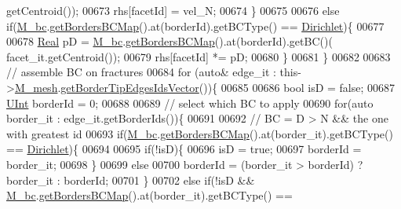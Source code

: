 \begin{DoxyCode}
      getCentroid());
00673             rhs[facetId] = vel\_N;
00674         \}
00675         
00676         \textcolor{keywordflow}{else} \textcolor{keywordflow}{if}(\hyperlink{classFVCode3D_1_1StiffMatrix_a23e3ffc97fcf112958e9966cac41e9d3}{M\_bc}.\hyperlink{classFVCode3D_1_1BoundaryConditions_a5b53a81bdab88709fae14892bfe6a7c9}{getBordersBCMap}().at(borderId).getBCType() == 
      \hyperlink{namespaceFVCode3D_a73660061f11f1671164ce171a053f8c5a192024697bdaa4fbbb39b8961b747bce}{Dirichlet})\{
00677                         
00678                         \hyperlink{namespaceFVCode3D_a40c1f5588a248569d80aa5f867080e83}{Real} pD = \hyperlink{classFVCode3D_1_1StiffMatrix_a23e3ffc97fcf112958e9966cac41e9d3}{M\_bc}.\hyperlink{classFVCode3D_1_1BoundaryConditions_a5b53a81bdab88709fae14892bfe6a7c9}{getBordersBCMap}().at(borderId).getBC()(
      facet\_it.getCentroid());
00679                         rhs[facetId] *= pD;
00680                 \}
00681     \}
00682 
00683     \textcolor{comment}{// assemble BC on fractures}
00684     \textcolor{keywordflow}{for} (\textcolor{keyword}{auto}& edge\_it : this->\hyperlink{classFVCode3D_1_1MatrixHandler_a72f185cb557fc2e8023bd09a074f685c}{M\_mesh}.\hyperlink{classFVCode3D_1_1Rigid__Mesh_a12c92b683cfb3d9ac2645f038a8c6220}{getBorderTipEdgesIdsVector}())\{
00685                 
00686         \textcolor{keywordtype}{bool} isD = \textcolor{keyword}{false};
00687         \hyperlink{namespaceFVCode3D_a4bf7e328c75d0fd504050d040ebe9eda}{UInt} borderId = 0;
00688 
00689         \textcolor{comment}{// select which BC to apply}
00690         \textcolor{keywordflow}{for}(\textcolor{keyword}{auto} border\_it : edge\_it.getBorderIds())\{
00691                         
00692             \textcolor{comment}{// BC = D > N && the one with greatest id}
00693             \textcolor{keywordflow}{if}(\hyperlink{classFVCode3D_1_1StiffMatrix_a23e3ffc97fcf112958e9966cac41e9d3}{M\_bc}.\hyperlink{classFVCode3D_1_1BoundaryConditions_a5b53a81bdab88709fae14892bfe6a7c9}{getBordersBCMap}().at(border\_it).getBCType() == 
      \hyperlink{namespaceFVCode3D_a73660061f11f1671164ce171a053f8c5a192024697bdaa4fbbb39b8961b747bce}{Dirichlet})\{
00694                                 
00695                 \textcolor{keywordflow}{if}(!isD)\{
00696                     isD = \textcolor{keyword}{true};
00697                     borderId = border\_it;
00698                 \}
00699                 \textcolor{keywordflow}{else}
00700                     borderId = (border\_it > borderId) ? border\_it : borderId;
00701             \}
00702             \textcolor{keywordflow}{else} \textcolor{keywordflow}{if}(!isD && \hyperlink{classFVCode3D_1_1StiffMatrix_a23e3ffc97fcf112958e9966cac41e9d3}{M\_bc}.\hyperlink{classFVCode3D_1_1BoundaryConditions_a5b53a81bdab88709fae14892bfe6a7c9}{getBordersBCMap}().at(border\_it).getBCType() == 

\end{DoxyCode}
